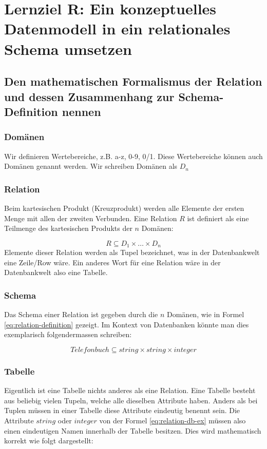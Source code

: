 \section{Lernziel R: Ein konzeptuelles Datenmodell in ein relationales Schema umsetzen}

\subsection{Den mathematischen Formalismus der Relation und dessen Zusammenhang zur Schema-Definition nennen}

\subsubsection{Domänen}
Wir definieren Wertebereiche, z.B. a-z, 0-9, 0/1. Diese Wertebereiche können auch Domänen genannt werden. Wir schreiben Domänen als $D_{n}$

\subsubsection{Relation}
Beim kartesischen Produkt (Kreuzprodukt) werden alle Elemente der ersten Menge mit allen der zweiten Verbunden. Eine Relation $R$ ist definiert als eine Teilmenge des kartesischen Produkts der $n$ Domänen:

\begin{equation}\label{eq:relation-definition}
    R \subseteq D_{1} \times \dots \times D_{n}
\end{equation}
Elemente dieser Relation werden als Tupel bezeichnet, was in der Datenbankwelt eine Zeile/Row wäre.
Ein anderes Wort für eine Relation wäre in der Datenbankwelt also eine Tabelle. 
\subsubsection{Schema}
Das Schema einer Relation ist gegeben durch die $n$ Domänen, wie in Formel \ref{eq:relation-definition} gezeigt. Im Kontext von Datenbanken könnte man dies exemplarisch folgendermassen schreiben:

\begin{equation}\label{eq:relation-db-ex}
    Telefonbuch \subseteq string \times string \times integer
\end{equation}

\subsubsection{Tabelle}
Eigentlich ist eine Tabelle nichts anderes als eine Relation. Eine Tabelle besteht aus beliebig vielen Tupeln, welche alle dieselben Attribute haben. Anders als bei Tuplen müssen in einer Tabelle diese Attribute eindeutig benennt sein.
Die Attribute $string$ oder $integer$ von der Formel \ref{eq:relation-db-ex} müssen also einen eindeutigen Namen innerhalb der Tabelle besitzen. Dies wird mathematisch korrekt wie folgt dargestellt:

